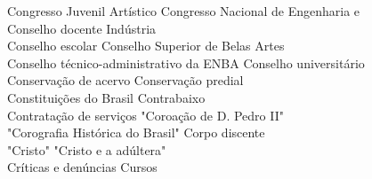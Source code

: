 \begin{tabbing}
	Congresso Juvenil Artístico \> Congresso Nacional de Engenharia e\\
	Conselho docente \> Indústria\\
	Conselho escolar \> Conselho Superior de Belas Artes\\ 
	Conselho técnico-administrativo da ENBA \>  Conselho universitário\\ 
	Conservação de acervo \> Conservação predial\\ 
	Constituições do Brasil \> Contrabaixo\\
	Contratação de serviços \> "Coroação de D. Pedro II" \\	
	"Corografia Histórica do Brasil" \> Corpo discente\\ 
	 "Cristo" \> "Cristo e a adúltera"\\
	Críticas e denúncias \> Cursos \\		   	   	   	   
\end{tabbing}


